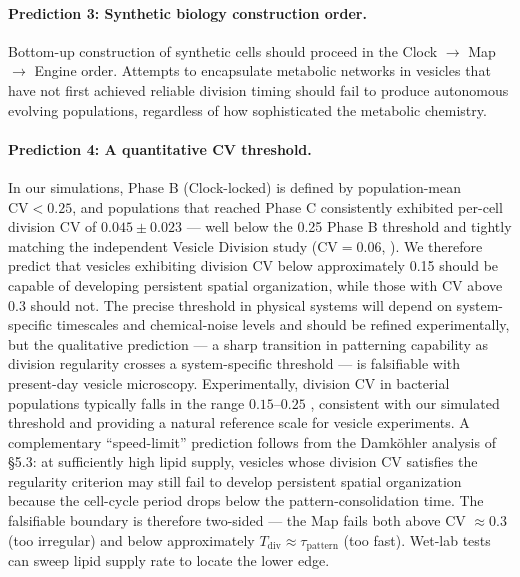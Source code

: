 \documentclass[11pt,letterpaper]{article}
\begin{document}
\paragraph{Prediction 3: Synthetic biology construction order.} Bottom-up construction of synthetic cells should proceed in the Clock $\to$ Map $\to$ Engine order. Attempts to encapsulate metabolic networks in vesicles that have not first achieved reliable division timing should fail to produce autonomous evolving populations, regardless of how sophisticated the metabolic chemistry.

\paragraph{Prediction 4: A quantitative CV threshold.} In our simulations, Phase B (Clock-locked) is defined by population-mean $\mathrm{CV} < 0.25$, and populations that reached Phase C consistently exhibited per-cell division CV of $0.045 \pm 0.023$ --- well below the 0.25 Phase B threshold and tightly matching the independent Vesicle Division study ($\mathrm{CV} = 0.06$, \citealt{farina2025vesicle}). We therefore predict that vesicles exhibiting division CV below approximately 0.15 should be capable of developing persistent spatial organization, while those with CV above 0.3 should not. The precise threshold in physical systems will depend on system-specific timescales and chemical-noise levels and should be refined experimentally, but the qualitative prediction --- a sharp transition in patterning capability as division regularity crosses a system-specific threshold --- is falsifiable with present-day vesicle microscopy. Experimentally, division CV in bacterial populations typically falls in the range $0.15$--$0.25$ \citep{stewart2005aging,taheriaraghi2015cellsize}, consistent with our simulated threshold and providing a natural reference scale for vesicle experiments. A complementary ``speed-limit'' prediction follows from the Damk\"ohler analysis of \S5.3: at sufficiently high lipid supply, vesicles whose division CV satisfies the regularity criterion may still fail to develop persistent spatial organization because the cell-cycle period drops below the pattern-consolidation time. The falsifiable boundary is therefore two-sided --- the Map fails both above CV $\approx 0.3$ (too irregular) and below approximately $T_{\mathrm{div}} \approx \tau_{\mathrm{pattern}}$ (too fast). Wet-lab tests can sweep lipid supply rate to locate the lower edge.

\end{document}
